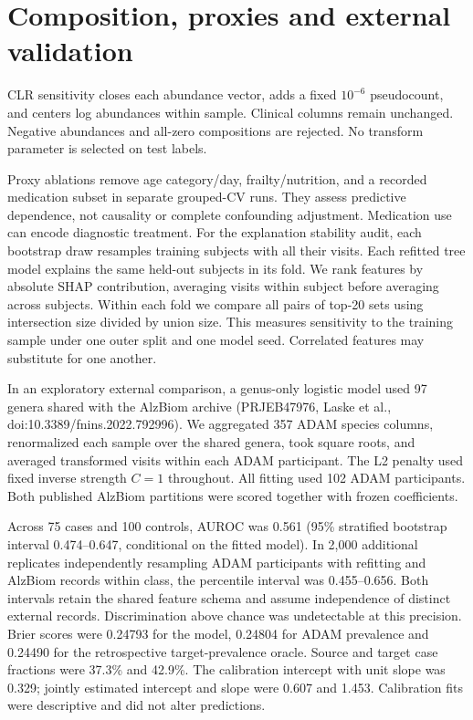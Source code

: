 \documentclass[manuscript,review,anonymous]{acmart}
\begin{document}
\section{Composition, proxies and external validation}
CLR sensitivity closes each abundance vector, adds a fixed $10^{-6}$ pseudocount, and centers log abundances within sample. Clinical columns remain unchanged. Negative abundances and all-zero compositions are rejected. No transform parameter is selected on test labels.

Proxy ablations remove age category/day, frailty/nutrition, and a recorded medication subset in separate grouped-CV runs. They assess predictive dependence, not causality or complete confounding adjustment. Medication use can encode diagnostic treatment. For the explanation stability audit, each bootstrap draw resamples training subjects with all their visits. Each refitted tree model explains the same held-out subjects in its fold. We rank features by absolute SHAP contribution, averaging visits within subject before averaging across subjects. Within each fold we compare all pairs of top-20 sets using intersection size divided by union size. This measures sensitivity to the training sample under one outer split and one model seed. Correlated features may substitute for one another.

In an exploratory external comparison, a genus-only logistic model used 97 genera shared with the AlzBiom archive (PRJEB47976, Laske et al., doi:10.3389/fnins.2022.792996). We aggregated 357 ADAM species columns, renormalized each sample over the shared genera, took square roots, and averaged transformed visits within each ADAM participant. The L2 penalty used fixed inverse strength $C=1$ throughout. All fitting used 102 ADAM participants. Both published AlzBiom partitions were scored together with frozen coefficients.

Across 75 cases and 100 controls, AUROC was 0.561 (95\% stratified bootstrap interval 0.474--0.647, conditional on the fitted model). In 2,000 additional replicates independently resampling ADAM participants with refitting and AlzBiom records within class, the percentile interval was 0.455--0.656. Both intervals retain the shared feature schema and assume independence of distinct external records. Discrimination above chance was undetectable at this precision. Brier scores were 0.24793 for the model, 0.24804 for ADAM prevalence and 0.24490 for the retrospective target-prevalence oracle. Source and target case fractions were 37.3\% and 42.9\%. The calibration intercept with unit slope was 0.329; jointly estimated intercept and slope were 0.607 and 1.453. Calibration fits were descriptive and did not alter predictions.
\end{document}
